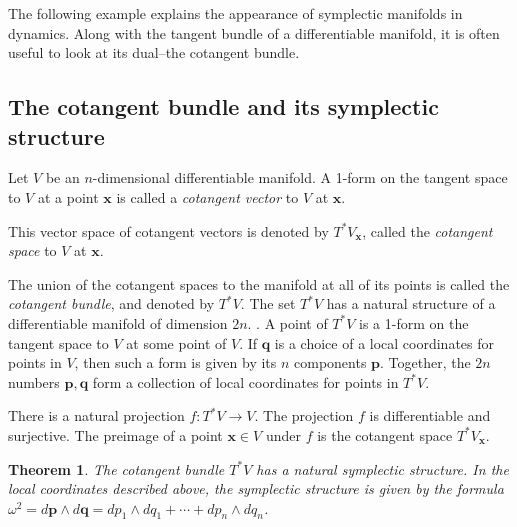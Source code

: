 \documentclass{book}
\numberwithin{equation}{section}
\theoremstyle{plain}
\newtheorem*{thm*}{Theorem}
\theoremstyle{definition}
\theoremstyle{remark}
\theoremstyle{remark}
\begin{document}
The following example explains the appearance of symplectic manifolds
in dynamics.  Along with the tangent bundle of a differentiable manifold,
it is often useful to look at its dual--the cotangent bundle.

\subsection{The cotangent bundle and its symplectic structure}



Let $V$ be an $n$-dimensional differentiable manifold.
%
A 1-form on the tangent space to $V$ at a point $\mathbf x$ is called
a \emph{cotangent vector} to $V$ at $\mathbf x$.

This vector space of cotangent vectors is denoted by $T^*V_{\mathbf x}$,
called the \emph{cotangent space} to $V$ at $\mathbf x$.

The union of the cotangent spaces to the manifold at all of its points
is called the \emph{cotangent bundle}, and denoted by $T^*V$.
%
The set $T^*V$ has a natural structure of a differentiable manifold of
dimension $2 n$.
.
%
A point of $T^*V$ is a 1-form on the tangent space to $V$ at some point of $V$.
%
If $\mathbf q$ is a choice of a local coordinates for points in $V$,
then such a form is given by its $n$ components $\mathbf p$.
%
Together, the $2n$ numbers $\mathbf p, \mathbf q$ form a collection of local coordinates
for points in $T^*V$.


There is a natural projection
$f: T^*V \rightarrow V$.
%
The projection $f$ is differentiable and surjective.
%
The preimage of a point $\mathbf x \in V$ under $f$
is the cotangent space $T^*V_{\mathbf x}$.


\begin{thm*}
The cotangent bundle $T^*V$ has a natural symplectic structure.
%
In the local coordinates described above,
the symplectic structure is given by the formula
$\omega^2 = d\mathbf p \wedge d\mathbf q = dp_1 \wedge dq_1 + \cdots + dp_n \wedge dq_n$.
\end{thm*}
\end{document}
